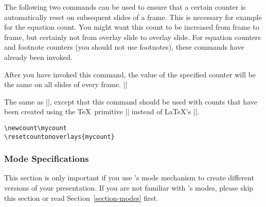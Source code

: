 
The following two commands can be used to ensure that a certain counter is automatically reset on subsequent slides of a frame. This is necessary for example for the equation count. You might want this count to be increased from frame to frame, but certainly not from overlay slide to overlay slide. For equation counters and footnote counters (you should not use footnotes), these commands have already been invoked.

\begin{command}{\resetcounteronoverlays{}}
  After you have invoked this command, the value of the specified counter will be the same on all slides of every frame.
  \example
  ||
\end{command}

\begin{command}{\resetcountonoverlays{}}
  The same as |\resetcounteronoverlays|, except that this command should be used with counts that have been created using the \TeX\ primitive |\newcount| instead of \LaTeX's ||.
  \example
\begin{verbatim}
\newcount\mycount
\resetcountonoverlays{mycount}
\end{verbatim}
\end{command}

\subsubsection{Mode Specifications}

This section is only important if you use \beamer's mode mechanism to create different versions of your presentation. If you are not familiar with \beamer's modes, please skip this section or read Section~\ref{section-modes} first.

